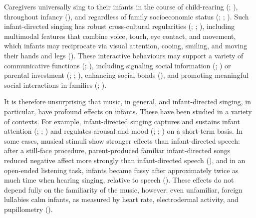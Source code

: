 \documentclass[
]{article}
\begin{document}
Caregivers universally sing to their infants in the course of
child-rearing (;
), throughout infancy
(), and regardless of family
socioeconomic status (;
;
). Such
infant-directed singing has robust cross-cultural regularities
(;
;
), including multimodal
features that combine voice, touch, eye contact, and movement, which
infants may reciprocate via visual attention, cooing, smiling, and
moving their hands and legs (). These interactive behaviours may support a variety
of communicative functions (; ),
including signaling social information (; ) or parental
investment (;
;
), enhancing social bonds
(), and promoting
meaningful social interactions in families
(;
).

It is therefore unsurprising that music, in general, and infant-directed
singing, in particular, have profound effects on infants. These have
been studied in a variety of contexts. For example, infant-directed
singing captures and sustains infant attention
(;
;
) and regulates arousal
and mood (;
;
) on a short-term
basis. In some cases, musical stimuli show stronger effects than
infant-directed speech: after a still-face procedure, parent-produced
familiar infant-directed songs reduced negative affect more strongly
than infant-directed speech (), and in an open-ended listening task, infants became
fussy after approximately twice as much time when hearing singing,
relative to speech ().
These effects do not depend fully on the familiarity of the music,
however: even unfamiliar, foreign lullabies calm infants, as measured by
heart rate, electrodermal activity, and pupillometry
().
\end{document}
